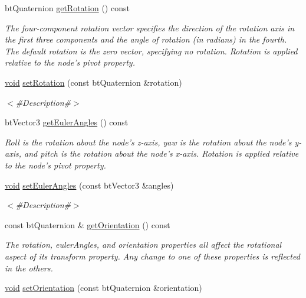 \begin{DoxyCompactItemize}
bt\+Quaternion \mbox{\hyperlink{classnjli_1_1_node_ae2bbaba19dc71e3731af5f63be1014ae}{get\+Rotation}} () const
\begin{DoxyCompactList}\small\item\em The four-\/component rotation vector specifies the direction of the rotation axis in the first three components and the angle of rotation (in radians) in the fourth. The default rotation is the zero vector, specifying no rotation. Rotation is applied relative to the node’s pivot property. \end{DoxyCompactList}\item 
\mbox{\hyperlink{_thread_8h_af1e856da2e658414cb2456cb6f7ebc66}{void}} \mbox{\hyperlink{classnjli_1_1_node_a81bfccbe8ff15eed2fb694c018910184}{set\+Rotation}} (const bt\+Quaternion \&rotation)
\begin{DoxyCompactList}\small\item\em $<$\#\+Description\#$>$ \end{DoxyCompactList}\item 
bt\+Vector3 \mbox{\hyperlink{classnjli_1_1_node_a83815891fb443ca57d90572405b2c606}{get\+Euler\+Angles}} () const
\begin{DoxyCompactList}\small\item\em Roll is the rotation about the node’s z-\/axis, yaw is the rotation about the node’s y-\/axis, and pitch is the rotation about the node’s x-\/axis. Rotation is applied relative to the node’s pivot property. \end{DoxyCompactList}\item 
\mbox{\hyperlink{_thread_8h_af1e856da2e658414cb2456cb6f7ebc66}{void}} \mbox{\hyperlink{classnjli_1_1_node_a13770061dcc44d37c1f2a94eb0cdddff}{set\+Euler\+Angles}} (const bt\+Vector3 \&angles)
\begin{DoxyCompactList}\small\item\em $<$\#\+Description\#$>$ \end{DoxyCompactList}\item 
const bt\+Quaternion \& \mbox{\hyperlink{classnjli_1_1_node_ac0add98eca113cca1ece6bfc42bd2ad0}{get\+Orientation}} () const
\begin{DoxyCompactList}\small\item\em The rotation, euler\+Angles, and orientation properties all affect the rotational aspect of its transform property. Any change to one of these properties is reflected in the others. \end{DoxyCompactList}\item 
\mbox{\hyperlink{_thread_8h_af1e856da2e658414cb2456cb6f7ebc66}{void}} \mbox{\hyperlink{classnjli_1_1_node_a176cf31ddc96051576f3c2357b8c5db4}{set\+Orientation}} (const bt\+Quaternion \&orientation)

\end{DoxyCompactItemize}
